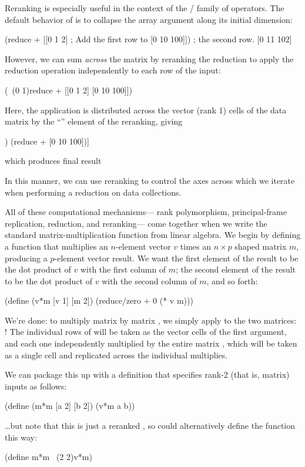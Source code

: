 Reranking is especially useful in the context of the /
family of operators.
The default behavior of  is to collapse the array argument
along its initial dimension:
\begin{code}
    (reduce + [[0  1   2]     ; Add the first row to 
               [0 10 100]])   ; the second row.
[0 11 102]\end{code}
However, we can sum \emph{across} the matrix by reranking the reduction
to apply the reduction operation independently to each row of the
input:
\begin{code}
    (~(0 1)reduce + [[0  1   2]
                     [0 10 100]])\end{code}
Here, the  application is distributed across
the vector (rank 1) cells of the data matrix by the ``'' element
of the reranking, giving
\begin{code}
    [(reduce + [0  1   2])
     (reduce + [0 10 100])]\end{code}
which produces final result
\begin{code}
\result{[3 110]}\end{code}
In this manner, we can use reranking to 
control the axes across which we iterate
when performing a reduction on data collections.

All of these computational mechanisms---%
rank polymorphism, principal-frame replication, reduction, and reranking---%
come together when
we write the standard  matrix-multiplication function from linear algebra.
We begin by defining a function  that multiplies
an $n$-element vector $v$ times an $n \times p$ shaped matrix $m$,
producing a $p$-element vector result.
We want the first element of the result
to be the dot product of $v$ with the first column of $m$;
the second element of the result to be the dot product of $v$ with
the second column of $m$, and so forth:
\begin{code}
    (define (v*m [v 1] [m 2]) (reduce/zero + 0 (* v m)))\end{code}

We're done:
to multiply matrix  by matrix ,
we simply apply  to the two matrices: !
The individual rows of  will be taken as the vector cells of the
first argument, and
each one independently multiplied by the entire matrix ,
which will be taken as a single cell and
replicated across the individual multiplies.

We can package this up with a definition that specifies rank-2
(that is, matrix) inputs as follows:
\begin{code}
    (define (m*m [a 2] [b 2]) (v*m a b))\end{code}
\ldots but note that this is just a reranked ,
so could alternatively define the function this way:
\begin{code}
    (define m*m ~(2 2)v*m)\end{code}

